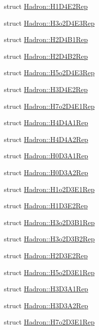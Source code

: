 \begin{DoxyCompactItemize}
\item 
struct \mbox{\hyperlink{structHadron_1_1H1D4E2Rep}{Hadron\+::\+H1\+D4\+E2\+Rep}}
\item 
struct \mbox{\hyperlink{structHadron_1_1H3o2D4E3Rep}{Hadron\+::\+H3o2\+D4\+E3\+Rep}}
\item 
struct \mbox{\hyperlink{structHadron_1_1H2D4B1Rep}{Hadron\+::\+H2\+D4\+B1\+Rep}}
\item 
struct \mbox{\hyperlink{structHadron_1_1H2D4B2Rep}{Hadron\+::\+H2\+D4\+B2\+Rep}}
\item 
struct \mbox{\hyperlink{structHadron_1_1H5o2D4E3Rep}{Hadron\+::\+H5o2\+D4\+E3\+Rep}}
\item 
struct \mbox{\hyperlink{structHadron_1_1H3D4E2Rep}{Hadron\+::\+H3\+D4\+E2\+Rep}}
\item 
struct \mbox{\hyperlink{structHadron_1_1H7o2D4E1Rep}{Hadron\+::\+H7o2\+D4\+E1\+Rep}}
\item 
struct \mbox{\hyperlink{structHadron_1_1H4D4A1Rep}{Hadron\+::\+H4\+D4\+A1\+Rep}}
\item 
struct \mbox{\hyperlink{structHadron_1_1H4D4A2Rep}{Hadron\+::\+H4\+D4\+A2\+Rep}}
\item 
struct \mbox{\hyperlink{structHadron_1_1H0D3A1Rep}{Hadron\+::\+H0\+D3\+A1\+Rep}}
\item 
struct \mbox{\hyperlink{structHadron_1_1H0D3A2Rep}{Hadron\+::\+H0\+D3\+A2\+Rep}}
\item 
struct \mbox{\hyperlink{structHadron_1_1H1o2D3E1Rep}{Hadron\+::\+H1o2\+D3\+E1\+Rep}}
\item 
struct \mbox{\hyperlink{structHadron_1_1H1D3E2Rep}{Hadron\+::\+H1\+D3\+E2\+Rep}}
\item 
struct \mbox{\hyperlink{structHadron_1_1H3o2D3B1Rep}{Hadron\+::\+H3o2\+D3\+B1\+Rep}}
\item 
struct \mbox{\hyperlink{structHadron_1_1H3o2D3B2Rep}{Hadron\+::\+H3o2\+D3\+B2\+Rep}}
\item 
struct \mbox{\hyperlink{structHadron_1_1H2D3E2Rep}{Hadron\+::\+H2\+D3\+E2\+Rep}}
\item 
struct \mbox{\hyperlink{structHadron_1_1H5o2D3E1Rep}{Hadron\+::\+H5o2\+D3\+E1\+Rep}}
\item 
struct \mbox{\hyperlink{structHadron_1_1H3D3A1Rep}{Hadron\+::\+H3\+D3\+A1\+Rep}}
\item 
struct \mbox{\hyperlink{structHadron_1_1H3D3A2Rep}{Hadron\+::\+H3\+D3\+A2\+Rep}}
\item 
struct \mbox{\hyperlink{structHadron_1_1H7o2D3E1Rep}{Hadron\+::\+H7o2\+D3\+E1\+Rep}}
\item 

\end{DoxyCompactItemize}
